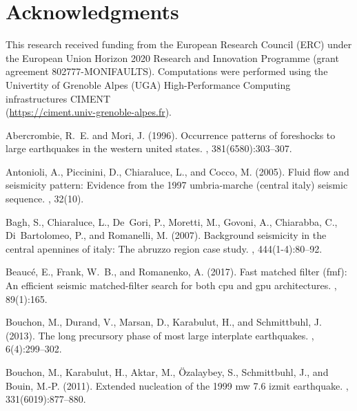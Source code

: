 \documentclass[a4paper,12pt,twoside]{article}
\begin{document}
\section*{Acknowledgments}

This research received funding from the European Research Council (ERC) under the European Union   Horizon 2020 Research and Innovation Programme (grant  agreement 802777-MONIFAULTS). Computations were performed using the Univertity of Grenoble Alpes (UGA) High-Performance Computing infrastructures CIMENT \\ \noindent (\href{https://ciment.univ-grenoble-alpes.fr}{\color{blue}https://ciment.univ-grenoble-alpes.fr}). 

%
%

\begin{thebibliography}{}

Abercrombie, R.~E. and Mori, J. (1996).
\newblock Occurrence patterns of foreshocks to large earthquakes in the western
  united states.
, 381(6580):303--307.

Antonioli, A., Piccinini, D., Chiaraluce, L., and Cocco, M. (2005).
\newblock Fluid flow and seismicity pattern: Evidence from the 1997
  umbria-marche (central italy) seismic sequence.
, 32(10).

Bagh, S., Chiaraluce, L., De~Gori, P., Moretti, M., Govoni, A., Chiarabba, C.,
  Di~Bartolomeo, P., and Romanelli, M. (2007).
\newblock Background seismicity in the central apennines of italy: The abruzzo
  region case study.
, 444(1-4):80--92.

Beauc\'e, E., Frank, W.~B., and Romanenko, A. (2017).
\newblock Fast matched filter (fmf): An efficient seismic matched-filter search
  for both cpu and gpu architectures.
, 89(1):165.

Bouchon, M., Durand, V., Marsan, D., Karabulut, H., and Schmittbuhl, J. (2013).
\newblock The long precursory phase of most large interplate earthquakes.
, 6(4):299--302.

Bouchon, M., Karabulut, H., Aktar, M., {\"O}zalaybey, S., Schmittbuhl, J., and
  Bouin, M.-P. (2011).
\newblock Extended nucleation of the 1999 mw 7.6 izmit earthquake.
, 331(6019):877--880.


\end{thebibliography}
\end{document}
